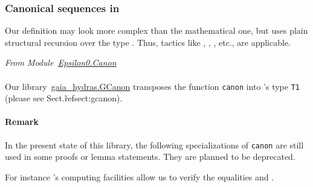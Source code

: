 \subsubsection{Canonical sequences in \coq}

Our definition may look more complex than the mathematical one, but
uses plain structural recursion over the type . Thus, tactics like
, , , etc., are applicable. 

\vspace{4pt}
\noindent\emph{From Module~\href{../theories/html/hydras.Epsilon0.Canon.html\#canon}{Epsilon0.Canon}}

\label{Functions:canonS}
\label{Functions:canon}



\paragraph*{\gaiasign} Our library~\href{../theories/html/gaia_hydras.GCanon.html}{gaia\_hydras.GCanon} transposes the  function \texttt{canon} into \gaia's type \texttt{T1}
(please see Sect.\~ref{sect:gcanon}).

\paragraph*{Remark}
In the present state of this library, the following specializations of \texttt{canon} are still used in some proofs or lemma statements. They are planned to be deprecated.






For instance \coq's computing facilities allow us to verify the equalities\linebreak 
{} and
.







